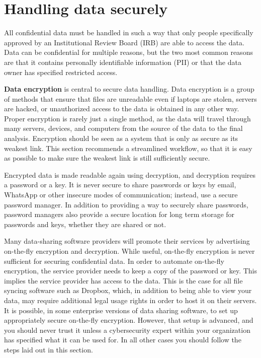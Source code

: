 \section{Handling data securely}

All confidential data must be handled in such a way that only people specifically 
approved by an Institutional Review Board (IRB)
are able to access the data.
Data can be confidential for multiple reasons, but the two most
common reasons are that it contains personally identifiable information (PII)
or that the data owner has specified restricted access.

\textbf{Data encryption} is central to secure data handling. 
Data encryption is a group of methods that ensure that files are unreadable 
even if laptops are stolen, servers are hacked, 
or unauthorized access to the data is obtained in any other way.
Proper encryption is rarely just a single method,
as the data will travel through many servers, devices, and computers
from the source of the data to the final analysis.
Encryption should be seen as a system that is only as secure as its weakest link.
This section recommends a streamlined workflow,
so that it is easy as possible to make sure the weakest link is still sufficiently secure.

Encrypted data is made readable again using decryption,
and decryption requires a password or a key.
It is never secure to share passwords or keys by email,
WhatsApp or other insecure modes of communication;
instead, use a secure password manager.
In addition to providing a way to securely share passwords,
password managers also provide a secure location
for long term storage for passwords and keys, whether they are shared or not.

Many data-sharing software providers will promote their services
by advertising on-the-fly encryption and decryption.
While useful, on-the-fly encryption is never sufficient for securing confidential data.
In order to automate on-the-fly encryption,
the service provider needs to keep a copy of the password or key.
This implies the service provider has access to the data.
This is the case for all file syncing software such as Dropbox,
which, in addition to being able to view your data, may require
additional legal usage rights in order to host it on their servers.
It is possible, in some enterprise versions of data sharing software,
to set up appropriately secure on-the-fly encryption.
However, that setup is advanced, and you should never trust it
unless a cybersecurity expert within your organization
has specified what it can be used for.
In all other cases you should follow the steps laid out in this section.


